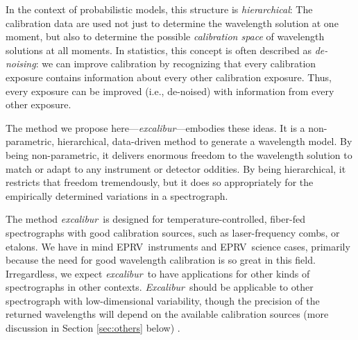 \documentclass[twocolumn,table,xcolor,trackchanges]{aastex63}
\newcommand{\project}[1]{\textsl{#1}}
\newcommand{\name}{\project{excalibur}}
\newcommand{\Name}{\project{Excalibur}}
\newcommand{\acronym}[1]{{\small{#1}}}
\newcommand{\eprv}{\acronym{EPRV}}
\begin{document}
In the context of probabilistic models, this structure is \emph{hierarchical}:  The calibration data are used not just to determine the wavelength solution at one moment, but also to determine the possible \emph{calibration space} of wavelength solutions at all moments.  In statistics, this concept is often described as \emph{de-noising}:  we can improve calibration by recognizing that every calibration exposure contains information about every other calibration exposure.  Thus, every exposure can be improved (i.e., de-noised) with information from every other exposure.

The method we propose here---\name---embodies these ideas.
It is a non-parametric, hierarchical, data-driven method to generate a wavelength model.  By being non-parametric, it delivers enormous freedom to the wavelength solution to match or adapt to any instrument or detector oddities.  By being hierarchical, it restricts that freedom tremendously, but it does so appropriately for the empirically determined variations in a spectrograph.

The method \name\ is designed for temperature-controlled, fiber-fed spectrographs with good calibration sources, such as laser-frequency combs, or etalons.  We have in mind \eprv\ instruments and \eprv\ science cases, primarily because the need for good wavelength calibration is so great in this field.  Irregardless, we expect \name\ to have applications for other kinds of spectrographs in other contexts.  \Name\ should be applicable to other spectrograph with low-dimensional variability, though the precision of the returned wavelengths will depend on the available calibration sources (more discussion in Section \ref{sec:others} below) .
\end{document}
